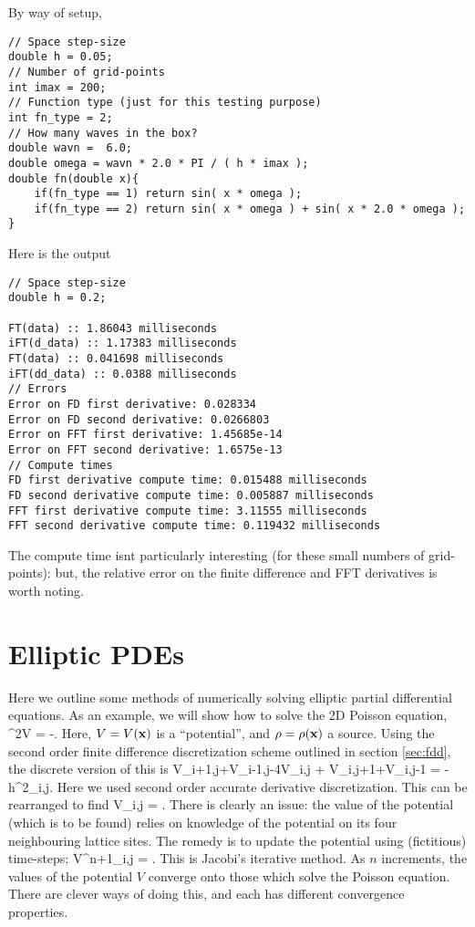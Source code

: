 \documentclass[amsmath,amssymb,12pt, eqsecnum]{revtex4}
\begin{document}
By way of setup,
\begin{verbatim}
// Space step-size
double h = 0.05;
// Number of grid-points
int imax = 200;
// Function type (just for this testing purpose)
int fn_type = 2;
// How many waves in the box?
double wavn =  6.0;
double omega = wavn * 2.0 * PI / ( h * imax );
double fn(double x){
    if(fn_type == 1) return sin( x * omega );
    if(fn_type == 2) return sin( x * omega ) + sin( x * 2.0 * omega );
}
\end{verbatim}
Here is the output 
\begin{verbatim}
// Space step-size
double h = 0.2;

FT(data) :: 1.86043 milliseconds
iFT(d_data) :: 1.17383 milliseconds
FT(data) :: 0.041698 milliseconds
iFT(dd_data) :: 0.0388 milliseconds
// Errors
Error on FD first derivative: 0.028334
Error on FD second derivative: 0.0266803
Error on FFT first derivative: 1.45685e-14
Error on FFT second derivative: 1.6575e-13
// Compute times
FD first derivative compute time: 0.015488 milliseconds
FD second derivative compute time: 0.005887 milliseconds
FFT first derivative compute time: 3.11555 milliseconds
FFT second derivative compute time: 0.119432 milliseconds
\end{verbatim}
The compute time  isnt particularly interesting (for these small numbers of grid-points): but, the relative error on the finite difference and FFT derivatives is worth noting.



\section{Elliptic PDEs}
Here we outline some methods of numerically solving elliptic partial differential equations. As an example, we will show how to solve the 2D Poisson equation,
\bea
\nabla^2V = -\rho.
\eea
Here, $V = V({\bf{x}})$ is a ``potential'', and $\rho = \rho({\bf{x}})$ a source.
Using the second order finite difference discretization scheme outlined  in section \ref{sec:fdd}, the discrete version of this is
\bea
V_{i+1,j}+V_{i-1,j}-4V_{i,j} + V_{i,j+1}+V_{i,j-1} = -h^2\rho_{i,j}.
\eea
Here we used second order accurate derivative discretization. This can be rearranged to find
\bea
V_{i,j} = .
\eea
There is clearly an issue: the value of the potential (which is to be found) relies on knowledge of the potential on its four neighbouring lattice sites. The remedy is to update the potential using (fictitious) time-steps;
\bea
\label{eq:sec:simple-update}
V^{n+1}_{i,j} = .
\eea
This is Jacobi's iterative method.
As $n$ increments, the values of the potential $V$ converge onto those which solve the Poisson equation. There are clever ways of doing this, and each has different convergence properties.
\end{document}
